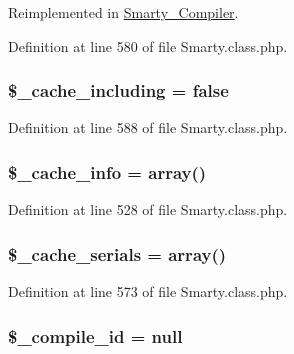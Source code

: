 \-Reimplemented in \hyperlink{class_smarty___compiler_a7f51c31864e6e5241313a2102dd32808}{\-Smarty\-\_\-\-Compiler}.



\-Definition at line 580 of file \-Smarty.\-class.\-php.

\hypertarget{class_smarty_a1fbc7764bc21f54adbe1ee17d9c72115}{
\subsubsection[{\$\-\_\-cache\-\_\-including}]{\setlength{\rightskip}{0pt plus 5cm}\$\-\_\-cache\-\_\-including = false}}\label{class_smarty_a1fbc7764bc21f54adbe1ee17d9c72115}


\-Definition at line 588 of file \-Smarty.\-class.\-php.

\hypertarget{class_smarty_acf32b5dd8fecc400d48e7452b5ec5640}{
\subsubsection[{\$\-\_\-cache\-\_\-info}]{\setlength{\rightskip}{0pt plus 5cm}\$\-\_\-cache\-\_\-info = array()}}\label{class_smarty_acf32b5dd8fecc400d48e7452b5ec5640}


\-Definition at line 528 of file \-Smarty.\-class.\-php.

\hypertarget{class_smarty_a0a5b5d0884aa98c7f7135d3aba17f578}{
\subsubsection[{\$\-\_\-cache\-\_\-serials}]{\setlength{\rightskip}{0pt plus 5cm}\$\-\_\-cache\-\_\-serials = array()}}\label{class_smarty_a0a5b5d0884aa98c7f7135d3aba17f578}


\-Definition at line 573 of file \-Smarty.\-class.\-php.

\hypertarget{class_smarty_ac327b0792184db847b78cae7da804eba}{
\subsubsection[{\$\-\_\-compile\-\_\-id}]{\setlength{\rightskip}{0pt plus 5cm}\$\-\_\-compile\-\_\-id = null}}\label{class_smarty_ac327b0792184db847b78cae7da804eba}


